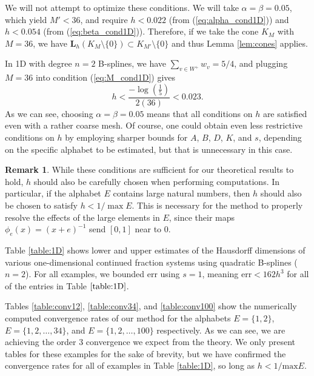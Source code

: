 \documentclass[10pt]{article}
\theoremstyle{definition}
\newtheorem*{remark}{Remark}
\numberwithin{equation}{section}
\numberwithin{figure}{section}
\numberwithin{table}{section}
\begin{document}
We will not attempt to optimize these conditions. We will take $\alpha=\beta=0.05$, which yield $M'<36$, and require $h<0.022$ (from (\ref{eq:alpha_cond1D})) and $h<0.054$ (from (\ref{eq:beta_cond1D})). Therefore, if we take the cone $K_M$ with $M=36$, we have $\mathbf{L}_h(K_M\setminus\{0\})\subset K_{M'}\setminus\{0\}$ and thus Lemma \ref{lem:cones} applies. %

In 1D with degree $n=2$ B-splines, we have $\sum_{v\in W^+}w_v=5/4$, and plugging $M=36$ into condition (\ref{eq:M_cond1D}) gives
$$h<\frac{-\log\left(\frac{1}{5}\right)}{2(36)}<0.023.$$  
As we can see, choosing $\alpha=\beta=0.05$ means that all conditions on $h$ are satisfied even with a rather coarse mesh. Of course, one could obtain even less restrictive conditions on $h$ by employing sharper bounds for $A$, $B$, $D$, $K$, and $s$, depending on the specific alphabet to be estimated, but that is unnecessary in this case. 

\begin{remark}
While these conditions are sufficient for our theoretical results to hold, $h$ should also be carefully chosen when performing computations. In particular, if the alphabet $E$ contains large natural numbers, then $h$ should also be chosen to satisfy $h<1/\max E$. This is necessary for the method to properly resolve the effects of the large elements in $E$, since their maps $\phi_e(x)=(x+e)^{-1}$ send $[0,1]$ near to $0$. 
\end{remark}

Table \ref{table:1D} shows lower and upper estimates of the Hausdorff dimensions of various one-dimensional continued fraction systems using quadratic B-splines ($n=2$). For all examples, we bounded $\mathrm{err}$ using $s=1$, meaning $\mathrm{err}<162h^3$ for all of the entries in Table $\ref{table:1D}$. %

Tables \ref{table:conv12}, \ref{table:conv34}, and \ref{table:conv100} show the numerically computed convergence rates of our method for the alphabets $E=\{1,2\}$, $E=\{1,2,\dots,34\}$, and $E=\{1,2,\dots,100\}$ respectively. As we can see, we are achieving the order 3 convergence we expect from the theory. We only present tables for these examples for the sake of brevity, but we have confirmed the convergence rates for all of examples in Table \ref{table:1D}, so long as $h<1/\mathrm{max}E$. 
\end{document}
